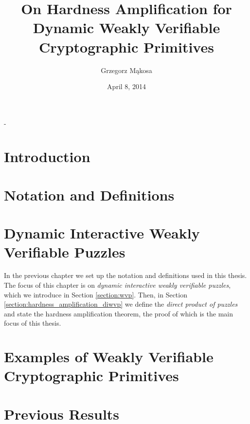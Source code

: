 \documentclass[11pt,a4paper,titlepage]{memoir}
\title{On Hardness Amplification for Dynamic Weakly Verifiable Cryptographic Primitives}
\author{Grzegorz M\k{a}kosa}
\date{April 8, 2014}
\begin{document}
\frontmatter

\begin{titlingpage}
  \calccentering{\unitlength}
  \begin{adjustwidth*}{\unitlength-24pt}{-\unitlength-24pt}
    \maketitle
  \end{adjustwidth*}
\end{titlingpage}


%

%
\cleartorecto
\tableofcontents
\mainmatter
%
\chapter{Introduction}
\label{ch:introduction}

%
\chapter{Notation and Definitions}
\label{ch:preliminaries}

%
\chapter{Dynamic Interactive Weakly Verifiable Puzzles}
\label{ch:diwvp_main_thm}
In the previous chapter we set up the notation and definitions used in this thesis.
The focus of this chapter is on \textit{dynamic interactive weakly verifiable puzzles}, which we introduce in Section \ref{section:wvp}.
Then, in Section \ref{section:hardness_amplification_diwvp} we define the \textit{direct product of puzzles}
and state the hardness amplification theorem, the proof of which is the main focus of this thesis.
%

%
\chapter{Examples of Weakly Verifiable Cryptographic Primitives}
\label{ch:examples_wvcp}

%
\chapter{Previous Results}
\label{ch:previous_results}

%
\end{document}

